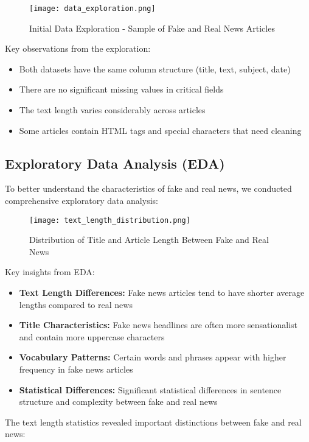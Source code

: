 \documentclass[12pt]{article}
\begin{document}
\begin{figure}[h]
    \centering
    \texttt{[image: data\_exploration.png]}
    \caption{Initial Data Exploration - Sample of Fake and Real News Articles}
\end{figure}

Key observations from the exploration:
\begin{itemize}
    \item Both datasets have the same column structure (title, text, subject, date)
    \item There are no significant missing values in critical fields
    \item The text length varies considerably across articles
    \item Some articles contain HTML tags and special characters that need cleaning
\end{itemize}

\subsection{Exploratory Data Analysis (EDA)}
To better understand the characteristics of fake and real news, we conducted comprehensive exploratory data analysis:

\begin{figure}[h]
    \centering
    \texttt{[image: text\_length\_distribution.png]}
    \caption{Distribution of Title and Article Length Between Fake and Real News}
\end{figure}

Key insights from EDA:
\begin{itemize}
    \item \textbf{Text Length Differences:} Fake news articles tend to have shorter average lengths compared to real news
    \item \textbf{Title Characteristics:} Fake news headlines are often more sensationalist and contain more uppercase characters
    \item \textbf{Vocabulary Patterns:} Certain words and phrases appear with higher frequency in fake news articles
    \item \textbf{Statistical Differences:} Significant statistical differences in sentence structure and complexity between fake and real news
\end{itemize}

The text length statistics revealed important distinctions between fake and real news:
\end{document}
